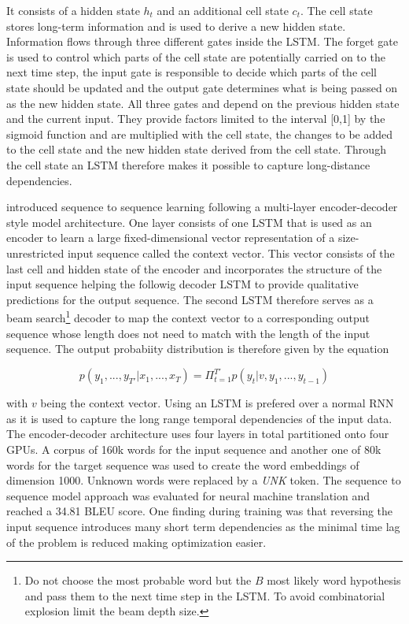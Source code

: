 It consists of a hidden state $h_t$ and an additional cell state $c_t$. The cell state stores long-term information and is used to derive a new hidden state. Information flows through three different gates inside the \ac{LSTM}. The forget gate is used to control which parts of the cell state are potentially carried on to the next time step, the input gate is responsible to decide which parts of the cell state should be updated and the output gate determines what is being passed on as the new hidden state. All three gates and depend on the previous hidden state and the current input. They provide factors limited to the interval [0,1] by the sigmoid function and are multiplied with the cell state, the changes to be added to the cell state and the new hidden state derived from the cell state. Through the cell state an \ac{LSTM} therefore makes it possible to capture long-distance dependencies. \cite{Gertz2020}

\cite{Sutskever2014} introduced sequence to sequence learning following a multi-layer encoder-decoder style model architecture. One layer consists of one \ac{LSTM} that is used as an encoder to learn a large fixed-dimensional vector representation of a size-unrestricted input sequence called the context vector. This vector consists of the last cell and hidden state of the encoder and incorporates the structure of the input sequence helping the followig decoder \ac{LSTM} to provide qualitative predictions for the output sequence. The second \ac{LSTM} therefore serves as a beam search\footnote{Do not choose the most probable word but the $B$ most likely word hypothesis and pass them to the next time step in the \ac{LSTM}. To avoid combinatorial explosion limit the beam depth size.} decoder to map the context vector to a corresponding output sequence whose length does not need to match with the length of the input sequence. The output probabiity distribution is therefore given by the equation

\begin{equation}
	p(y_1, ..., y_{T'} | x_1, ..., x_{T}) = \Pi_{t=1}^{T'} p(y_t | v, y_1, ..., y_{t-1})
\end{equation}

with $v$ being the context vector. Using an \ac{LSTM} is prefered over a normal \ac{RNN} as it is used to capture the long range temporal dependencies of the input data. The encoder-decoder architecture uses four layers in total partitioned onto four \acp{GPU}. A corpus of 160k words for the input sequence and another one of 80k words for the target sequence was used to create the word embeddings of dimension 1000. Unknown words were replaced by a \textit{UNK} token. The sequence to sequence model approach was evaluated for neural machine translation and reached a 34.81 BLEU score. One finding during training was that reversing the input sequence introduces many short term dependencies as the minimal time lag of the problem is reduced making optimization easier. \cite{Sutskever2014}

